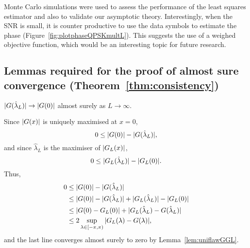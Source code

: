 \documentclass[journal]{IEEEtran}
\begin{document}
Monte Carlo simulations were used to assess the performance of the least squares estimator and also to validate our asymptotic theory.  Interestingly, when the SNR is small, it is counter productive to use the data symbols to estimate the phase (Figure~\ref{fig:plotphaseQPSKmultL}).  This suggests the use of a weighed objective function, which would be an interesting topic for future research.

\small


\normalsize
\appendix


\subsection{Lemmas required for the proof of almost sure convergence (Theorem~\ref{thm:consistency}) } \label{sec:proof-almost-sureappendix}

\begin{lemma}\label{lem:convtoexpGlamL} 
${\vert G(\hat{\lambda}_L) \vert} \rightarrow {\vert G(0) \vert}$ almost surely as $L \rightarrow \infty$.
\end{lemma}
\begin{IEEEproof}
Since ${\vert G(x) \vert}$ is uniquely maximised at $x=0$,
\[
0 \leq {\vert G(0) \vert} - {\vert G(\hat{\lambda}_L) \vert},
\]
and since $\hat{\lambda}_L$ is the maximiser of ${\left\vert G_L(x) \right\vert}$,
\[ 
0 \leq {\vert G_L(\hat{\lambda}_L) \vert} - {\vert G_L(0) \vert}.
\]
Thus,
\begin{align*}
0 &\leq {\vert G(0) \vert} - {\vert G(\hat{\lambda}_L) \vert} \\ 
& \leq {\vert G(0) \vert} - {\vert G(\hat{\lambda}_L) \vert} + {\vert G_L(\hat{\lambda}_L) \vert} - {\vert G_L(0) \vert}\\
& \leq |G(0) - G_L(0)| + |G_L(\hat{\lambda}_L) - G(\hat{\lambda}_L)| \\
&\leq 2\sup_{\lambda \in [-\pi, \pi)} {\vert G_L(\lambda) - G(\lambda) \vert},
\end{align*}
and the last line converges almost surely to zero by Lemma~\ref{lem:uniflawGGL}.
\end{IEEEproof}

\end{document}
